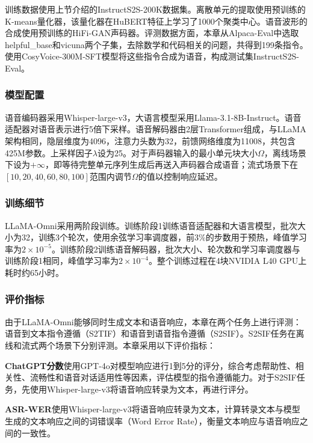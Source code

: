 训练数据使用上节介绍的InstructS2S-200K数据集。离散单元的提取使用预训练的K-means量化器，该量化器在HuBERT特征上学习了1000个聚类中心。语音波形的合成使用预训练的HiFi-GAN\citep{hifigan, polyak21_interspeech}声码器。评测数据方面，本章从Alpaca-Eval\citep{alpacaeval}中选取helpful\_base和vicuna两个子集，去除数学和代码相关的问题，共得到199条指令。使用CosyVoice-300M-SFT模型将这些指令合成为语音，构成测试集InstructS2S-Eval。

\subsubsection{模型配置}

语音编码器采用Whisper-large-v3，大语言模型采用Llama-3.1-8B-Instruct。语音适配器对语音表示进行5倍下采样。语音解码器由2层Transformer组成，与LLaMA架构相同，隐层维度为4096，注意力头数为32，前馈网络维度为11008，共包含425M参数。上采样因子$\lambda$设为25。对于声码器输入的最小单元块大小$\Omega$，离线场景下设为$+\infty$，即等待完整单元序列生成后再送入声码器合成语音；流式场景下在$[10, 20, 40, 60, 80, 100]$范围内调节$\Omega$的值以控制响应延迟。

\subsubsection{训练细节}

LLaMA-Omni采用两阶段训练。训练阶段1训练语音适配器和大语言模型，批次大小为32，训练3个轮次，使用余弦学习率调度器，前3\%的步数用于预热，峰值学习率为$2 \times 10^{-5}$。训练阶段2训练语音解码器，批次大小、轮次数和学习率调度器与训练阶段1相同，峰值学习率为$2 \times 10^{-4}$。整个训练过程在4块NVIDIA L40 GPU上耗时约65小时。

\subsubsection{评价指标}

由于LLaMA-Omni能够同时生成文本和语音响应，本章在两个任务上进行评测：语音到文本指令遵循（S2TIF）和语音到语音指令遵循（S2SIF）。S2SIF任务在离线和流式两个场景下分别评测。本章采用以下评价指标：

\textbf{ChatGPT分数}\quad 使用GPT-4o\citep{gpt4o}对模型响应进行1到5分的评分，综合考虑帮助性、相关性、流畅性和语音对话适用性等因素，评估模型的指令遵循能力。对于S2SIF任务，先使用Whisper-large-v3将语音响应转录为文本，再进行评分。

\textbf{ASR-WER}\quad 使用Whisper-large-v3将语音响应转录为文本，计算转录文本与模型生成的文本响应之间的词错误率（Word Error Rate），衡量文本响应与语音响应之间的一致性。

